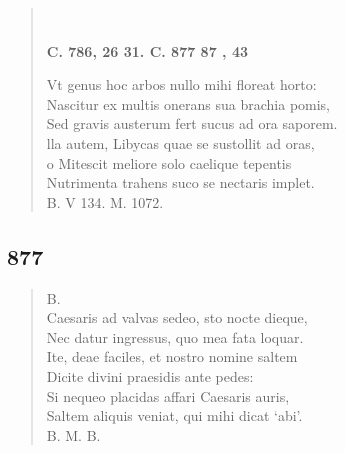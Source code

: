 \documentclass[11pt, a4paper]{report}
\begin{document}
\begin{verse}
        ﻿\pagebreak 
    \begin{center} \textbf{C. 786, 26 31. C. 877 87 , 43} \end{center} \marginpar{[327]} Vt genus hoc arbos nullo mihi floreat horto: \\ Nascitur ex multis onerans sua brachia pomis, \\ Sed gravis austerum fert sucus ad ora saporem. \\ lla autem, Libycas quae se sustollit ad oras, \\ o Mitescit meliore solo caelique tepentis \\ Nutrimenta trahens suco se nectaris implet. \\ B. V 134. M. 1072. \\ 
      \end{verse}
  
            \subsection*{877}
      \begin{verse}
      B. \\ Caesaris ad valvas sedeo, sto nocte dieque, \\ Nec datur ingressus, quo mea fata loquar. \\ Ite, deae faciles, et nostro nomine saltem \\ Dicite divini praesidis ante pedes: \\ Si nequeo placidas affari Caesaris auris, \\ Saltem aliquis veniat, qui mihi dicat ‘abi’. \\ B. M. B. \\ 
      \end{verse}
  
\end{document}
